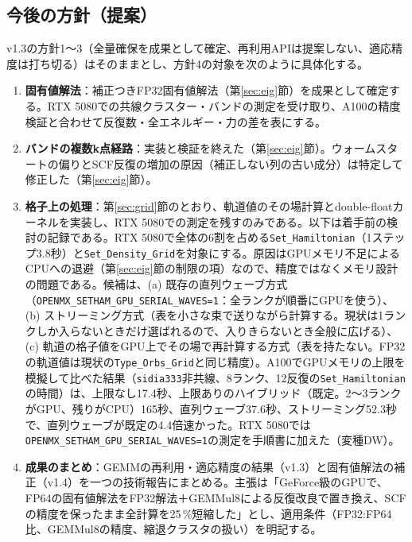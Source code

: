 \documentclass[a4paper,11pt]{ltjsarticle}
\newcommand{\code}[1]{\texttt{#1}}
\begin{document}
\subsection{今後の方針（提案）}\label{sec:next}
v1.3の方針1〜3（全量確保を成果として確定、再利用APIは提案しない、適応精度は打ち切る）はそのままとし、方針4の対象を次のように具体化する。
\begin{enumerate}
\item \textbf{固有値解法}：補正つきFP32固有値解法（第\ref{sec:eig}節）を成果として確定する。RTX 5080での共線クラスター・バンドの測定を受け取り、A100の精度検証と合わせて反復数・全エネルギー・力の差を表にする。
\item \textbf{バンドの複数k点経路}：実装と検証を終えた（第\ref{sec:eig}節）。ウォームスタートの偏りとSCF反復の増加の原因（補正しない列の古い成分）は特定して修正した（第\ref{sec:eig}節）。
\item \textbf{格子上の処理}：第\ref{sec:grid}節のとおり、軌道値のその場計算とdouble-floatカーネルを実装し、RTX 5080での測定を残すのみである。以下は着手前の検討の記録である。RTX 5080で全体の6割を占める\code{Set\_Hamiltonian}（1ステップ3.8秒）と\code{Set\_Density\_Grid}を対象にする。原因はGPUメモリ不足によるCPUへの退避（第\ref{sec:eig}節の制限の項）なので、精度ではなくメモリ設計の問題である。候補は、(a) 既存の直列ウェーブ方式（\code{OPENMX\_SETHAM\_GPU\_SERIAL\_WAVES=1}：全ランクが順番にGPUを使う）、(b) ストリーミング方式（表を小さな束で送りながら計算する。現状は1ランクしか入らないときだけ選ばれるので、入りきらないとき全般に広げる）、(c) 軌道の格子値をGPU上でその場で再計算する方式（表を持たない。FP32の軌道値は現状の\code{Type\_Orbs\_Grid}と同じ精度）。A100でGPUメモリの上限を模擬して比べた結果（\code{sidia333}非共線、8ランク、12反復の\code{Set\_Hamiltonian}の時間）は、上限なし17.4秒、上限ありのハイブリッド（既定。2〜3ランクがGPU、残りがCPU）165秒、直列ウェーブ37.6秒、ストリーミング52.3秒で、直列ウェーブが既定の4.4倍速かった。RTX 5080では\code{OPENMX\_SETHAM\_GPU\_SERIAL\_WAVES=1}の測定を手順書に加えた（変種DW）。
\item \textbf{成果のまとめ}：GEMMの再利用・適応精度の結果（v1.3）と固有値解法の補正（v1.4）を一つの技術報告にまとめる。主張は「GeForce級のGPUで、FP64の固有値解法をFP32解法＋GEMMul8による反復改良で置き換え、SCFの精度を保ったまま全計算を25\,\%短縮した」とし、適用条件（FP32:FP64比、GEMMul8の精度、縮退クラスタの扱い）を明記する。
\end{enumerate}
\end{document}
